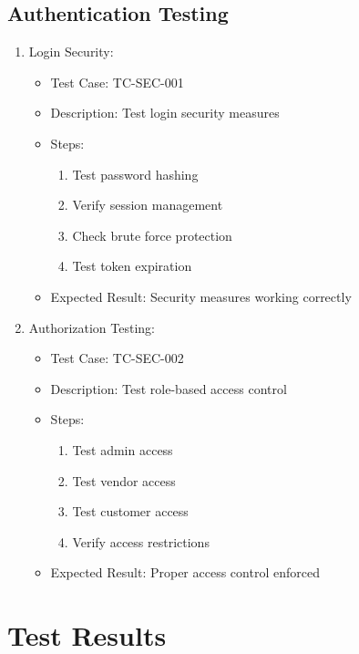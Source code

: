 \subsection{Authentication Testing}
\begin{enumerate}
    \item Login Security:
    \begin{itemize}
        \item Test Case: TC-SEC-001
        \item Description: Test login security measures
        \item Steps:
        \begin{enumerate}
            \item Test password hashing
            \item Verify session management
            \item Check brute force protection
            \item Test token expiration
        \end{enumerate}
        \item Expected Result: Security measures working correctly
    \end{itemize}

    \item Authorization Testing:
    \begin{itemize}
        \item Test Case: TC-SEC-002
        \item Description: Test role-based access control
        \item Steps:
        \begin{enumerate}
            \item Test admin access
            \item Test vendor access
            \item Test customer access
            \item Verify access restrictions
        \end{enumerate}
        \item Expected Result: Proper access control enforced
    \end{itemize}
\end{enumerate}

\section{Test Results}
